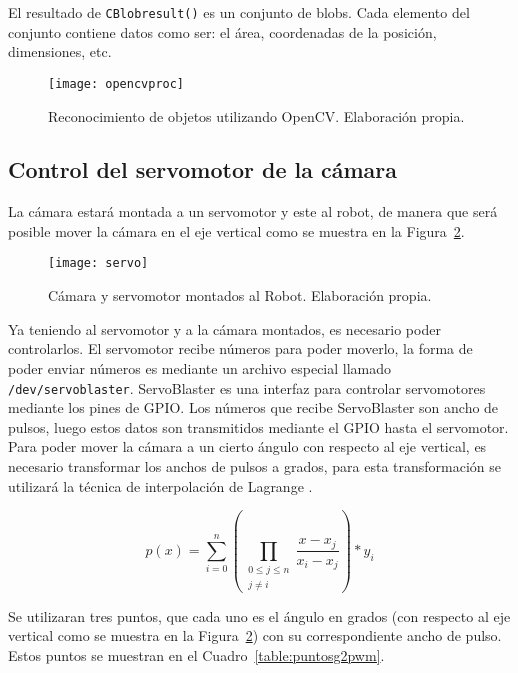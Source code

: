 El resultado de \texttt{CBlobresult()} es un conjunto de blobs. Cada elemento del conjunto contiene datos como ser: el área, coordenadas de la posición, dimensiones, etc. 

\begin{figure}
  \centering
    \texttt{[image: opencvproc]}
  \caption{Reconocimiento de objetos utilizando OpenCV. Elaboración propia.}
  \label{fig:opencvproc}
\end{figure}

\subsection{Control del servomotor de la cámara}
La cámara estará montada a un servomotor y este al robot, de manera que será posible mover la cámara en el eje vertical como se muestra en la Figura~\ref{fig:servo}.

\begin{figure}
  \centering 
    \texttt{[image: servo]}
  \caption{Cámara y servomotor montados al Robot. Elaboración propia.}
  \label{fig:servo}
\end{figure}
Ya teniendo al servomotor y a la cámara montados, es necesario poder controlarlos. El servomotor recibe números para poder moverlo, la forma de poder enviar números es mediante un archivo especial llamado \texttt{/dev/servoblaster}. ServoBlaster es una interfaz para controlar servomotores mediante los pines de GPIO. Los números que recibe ServoBlaster son ancho de pulsos, luego estos datos son transmitidos mediante el GPIO hasta el servomotor. Para poder mover la cámara a un cierto ángulo con respecto al eje vertical, es necesario transformar los anchos de pulsos a grados, para esta transformación se utilizará la técnica de interpolación de Lagrange \cite{ipolinomica}.

\begin{equation}
p(x) = \sum_{i=0}^{n}\left(\prod_{\substack{0 \leq j \leq n \\ j \neq i}}{\frac{x - x_j}{x_i - x_j}}\right) * y_i \label{lagrange}
\end{equation}

Se utilizaran tres puntos, que cada uno es el ángulo en grados (con respecto al eje vertical como se muestra en la Figura~\ref{fig:servo}) con su correspondiente ancho de pulso. Estos puntos se muestran en el Cuadro~\ref{table:puntosg2pwm}.

